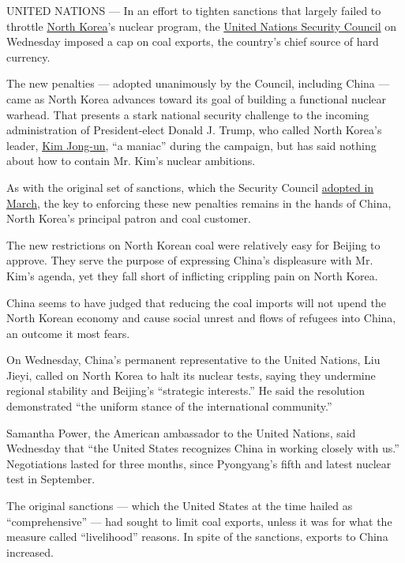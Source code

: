 UNITED NATIONS --- In an effort to tighten sanctions that largely failed
to throttle
\href{http://www.nytimes3xbfgragh.onion/topic/destination/north-korea?8qa}{North
Korea}'s nuclear program, the
\href{http://www.nytimes3xbfgragh.onion/topic/organization/security-council?8qa}{United
Nations Security Council} on Wednesday imposed a cap on coal exports,
the country's chief source of hard currency.

The new penalties --- adopted unanimously by the Council, including
China --- came as North Korea advances toward its goal of building a
functional nuclear warhead. That presents a stark national security
challenge to the incoming administration of President-elect Donald J.
Trump, who called North Korea's leader,
\href{http://www.nytimes3xbfgragh.onion/topic/person/kim-jongun?8qa}{Kim
Jong-un}, ``a maniac'' during the campaign, but has said nothing about
how to contain Mr. Kim's nuclear ambitions.

As with the original set of sanctions, which the Security Council
\href{http://www.nytimes3xbfgragh.onion/2016/03/03/world/asia/north-korea-un-sanctions.html}{adopted
in March}, the key to enforcing these new penalties remains in the hands
of China, North Korea's principal patron and coal customer.

The new restrictions on North Korean coal were relatively easy for
Beijing to approve. They serve the purpose of expressing China's
displeasure with Mr. Kim's agenda, yet they fall short of inflicting
crippling pain on North Korea.

China seems to have judged that reducing the coal imports will not upend
the North Korean economy and cause social unrest and flows of refugees
into China, an outcome it most fears.

On Wednesday, China's permanent representative to the United Nations,
Liu Jieyi, called on North Korea to halt its nuclear tests, saying they
undermine regional stability and Beijing's ``strategic interests.'' He
said the resolution demonstrated ``the uniform stance of the
international community.''

Samantha Power, the American ambassador to the United Nations, said
Wednesday that ``the United States recognizes China in working closely
with us.'' Negotiations lasted for three months, since Pyongyang's fifth
and latest nuclear test in September.

The original sanctions --- which the United States at the time hailed as
``comprehensive'' --- had sought to limit coal exports, unless it was
for what the measure called ``livelihood'' reasons. In spite of the
sanctions, exports to China increased.


